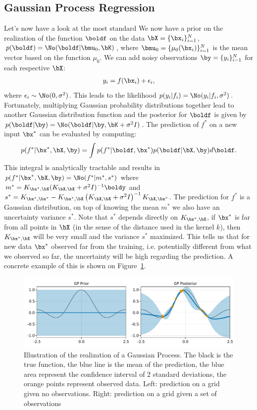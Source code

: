 \subsection{Gaussian Process Regression}

Let's now have a look at the most standard
We now have a prior on the realization of the function $\boldf$ on the data $\bX = \{\bx_i\}_{i=1}^N$, $p(\boldf) = \No(\boldf|\bmu_0, \bK)$, where $\bmu_0 = \{\mu_0(\bx_i)\}_{i=1}^N$ is the mean vector based on the function $\mu_0$.
We can add noisy observations $\by = \{y_i\}_{i=1}^N$ for each respective $\bX$:
\begin{align}
y_i = f(\bx_i) + \epsilon_i,
\end{align}
where $\epsilon_i \sim \No(0,\sigma^2)$.
This leads to the likelihood $p(y_i|f_i) = \No(y_i|f_i, \sigma^2)$.
Fortunately, multiplying Gaussian probability distributions together lead to another Gaussian distribution function and the posterior for $\boldf$ is given by $p(\boldf|\by) = \No(\boldf|\by, \bK + \sigma^2 I)$.
The prediction of $f^*$ on a new input $\bx^*$ can be evaluated by computing:
\begin{align}
p(f^*|\bx^*,\bX,\by) = \int p(f^*|\boldf,\bx^*)p(\boldf|\bX,\by)d\boldf.
\end{align}	
This integral is analytically tractable and results in $p(f^*|\bx^*,\bX,\by)=\No(f^*|m^*,s^*)$ where $m^* = K_{\bx^*,\bX}(K_{\bX,\bX} + \sigma^{2}I)^{-1}\boldy$ and $s^*=K_{\bx^*,\bx^*} - K_{\bx^*,\bX}\left(K_{\bX,\bX}+\sigma^2I\right)^{-1}K_{\bX,\bx^*}$.
The prediction for $f^*$ is a Gaussian distribution, on top of knowing the mean $m^*$ we also have an uncertainty variance $s^*$.
Note that $s^*$ depends directly on $K_{\bx^*,\bX}$, if $\bx^*$ is far from all points in $\bX$ (in the sense of the distance used in the kernel $k$), then $K_{\bx^*,\bX}$ will be very small and the variance $s^*$ maximized.
This tells us that for new data $\bx^*$ observed far from the training, i.e. potentially different from what we observed so far, the uncertainty will be high regarding the prediction.
A concrete example of this is shown on Figure~\ref{fig:gp_example}.

\begin{figure}
    \includegraphics[width=\textwidth]{./chapters/2_background/figures/GP_example.pdf}
    \caption{Illustration of the realization of a Gaussian Process. The black is the true function, the blue line is the mean of the prediction, the blue area represent the confidence interval of 2 standard deviations, the orange points represent observed data. Left: prediction on a grid given no observations. Right: prediction on a grid given a set of observations}
    \label{fig:gp_example}
\end{figure}

